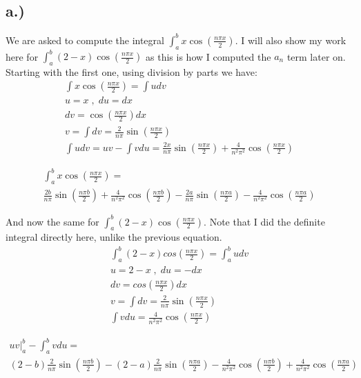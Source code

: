 \documentclass{article}
\begin{document}
\subsection*{a.)}
We are asked to compute the integral $\int_a^b x\cos(\frac{n\pi x}{2})$. I will also show my work here for $\int_a^b (2-x)\cos(\frac{n\pi x}{2})$ as this is how I computed the $a_n$ term later on. Starting with the first one, using division by parts we have:
\begin{equation}
\begin{aligned}
\int x\cos(\frac{n\pi x}{2}) = \int udv\\
u = x \; , \; du = dx\\
dv = \cos(\frac{n\pi x}{2})dx\\
v = \int dv = \frac{2}{n\pi}\sin(\frac{n\pi x}{2})\\
\int udv = uv - \int vdu = \frac{2x}{n\pi}\sin(\frac{n\pi x}{2}) + \frac{4}{n^2\pi^2}\cos(\frac{n\pi x}{2})
\end{aligned}
\end{equation}
\begin{tcolorbox}[minipage,colback=white,arc=0pt,outer arc=0pt]
\begin{multline}
\int_a^b x\cos(\frac{n\pi x}{2}) = \\ \frac{2b}{n\pi}\sin(\frac{n\pi b}{2}) + \frac{4}{n^2\pi^2}\cos(\frac{n\pi b}{2}) - \frac{2a}{n\pi}\sin(\frac{n\pi a}{2}) - \frac{4}{n^2\pi^2}\cos(\frac{n\pi a}{2})
\end{multline}
\end{tcolorbox}
And now the same for $\int_a^b (2-x)\cos(\frac{n\pi x}{2})$. Note that I did the definite integral directly here, unlike the previous equation.
\begin{equation}
\begin{aligned}
\int_a^b (2-x)cos(\frac{n\pi x}{2}) = \int_a^b udv\\
u = 2-x  \; , \; du = -dx\\
dv = cos(\frac{n\pi x}{2})dx\\
v = \int dv = \frac{2}{n\pi}\sin(\frac{n\pi x}{2})\\
\int vdu = \frac{4}{n^2\pi^2}\cos(\frac{n\pi x}{2})
\end{aligned}
\end{equation}
\begin{tcolorbox}[minipage,colback=white,arc=0pt,outer arc=0pt]
\begin{multline}
uv\Big|_a^b - \int_a^b vdu = \\ (2-b)\frac{2}{n\pi}\sin(\frac{n\pi b}{2}) - (2-a)\frac{2}{n\pi}\sin(\frac{n\pi a}{2}) - \frac{4}{n^2\pi^2}\cos(\frac{n\pi b}{2}) + \frac{4}{n^2\pi^2}\cos(\frac{n\pi a}{2})
\end{multline}
\end{tcolorbox}
\end{document}
